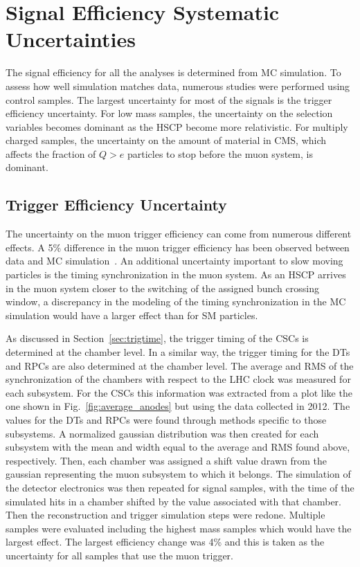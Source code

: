 \section{Signal Efficiency Systematic Uncertainties \label{sec:SystUnc}}

The signal efficiency for all the analyses is determined from MC simulation. To assess how well simulation matches data, numerous studies were performed using control samples.
The largest uncertainty for most of the signals is the trigger efficiency uncertainty. For low mass samples, the uncertainty on the selection variables becomes
dominant as the HSCP become more relativistic. For multiply charged samples, the uncertainty on the amount of material in CMS, which affects the fraction of $Q>e$ particles
to stop before the muon system, is dominant.

\subsection{Trigger Efficiency Uncertainty}


The uncertainty on the muon trigger efficiency can come from numerous different effects. 
A 5\% difference in the muon trigger efficiency has been observed between data and MC simulation~\cite{2012JInst...7P0002T}.
An additional uncertainty important to slow moving particles is the timing synchronization in the muon system. As an HSCP arrives in the muon system
closer to the switching of the assigned bunch crossing window, a discrepancy in the modeling of the timing synchronization in the MC simulation
would have a larger effect than for SM particles.

As discussed in Section~\ref{sec:trigtime}, the trigger timing of the CSCs is determined at the chamber level. In a similar way,
the trigger timing for the DTs and RPCs are also determined at the chamber level.
The average and RMS of the synchronization of the chambers with respect to the LHC clock was measured for each subsystem.
For the CSCs this information was extracted from a plot like the one shown in Fig.~\ref{fig:average_anodes} but using the data collected in 2012.
The values for the DTs and RPCs were found through methods specific to those subsystems.
A normalized gaussian distribution was then created for each subsystem with the mean and width equal to the average and RMS found above, respectively.
Then, each chamber was assigned a shift value drawn from the gaussian representing the muon subsystem to which it belongs.
The simulation of the detector electronics was then repeated for signal samples, with
the time of the simulated hits in a chamber shifted by the value associated with that chamber. Then the reconstruction and trigger
simulation steps were redone. 
Multiple samples were evaluated including the highest mass samples which would have the largest effect.
The largest efficiency change was 4\% and this is taken as the uncertainty for all samples that use the muon trigger.

